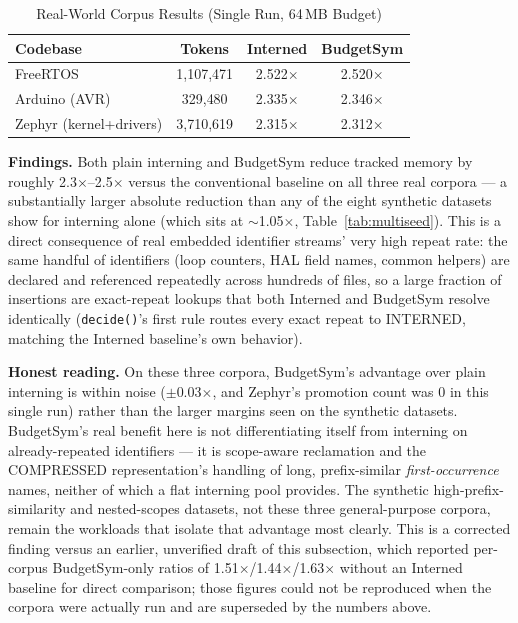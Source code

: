 \documentclass[conference]{IEEEtran}
\begin{document}
\begin{table}[htbp]
\caption{Real-World Corpus Results (Single Run, 64\,MB Budget)}
\label{tab:corpus}
\centering
\small
\begin{tabular}{lccc}
\toprule
Codebase & Tokens & Interned & BudgetSym \\
\midrule
FreeRTOS & 1{,}107{,}471 & 2.522$\times$ & 2.520$\times$ \\
Arduino (AVR) & 329{,}480 & 2.335$\times$ & 2.346$\times$ \\
Zephyr (kernel+drivers) & 3{,}710{,}619 & 2.315$\times$ & 2.312$\times$ \\
\bottomrule
\end{tabular}
\end{table}

\textbf{Findings.} Both plain interning and BudgetSym reduce tracked memory
by roughly 2.3$\times$--2.5$\times$ versus the conventional baseline on all
three real corpora --- a substantially larger absolute reduction than any of
the eight synthetic datasets show for interning alone (which sits at
$\sim$1.05$\times$, Table~\ref{tab:multiseed}). This is a direct consequence
of real embedded identifier streams' very high repeat rate: the same
handful of identifiers (loop counters, HAL field names, common helpers) are
declared and referenced repeatedly across hundreds of files, so a large
fraction of insertions are exact-repeat lookups that both Interned and
BudgetSym resolve identically (\texttt{decide()}'s first rule routes every
exact repeat to INTERNED, matching the Interned baseline's own behavior).

\textbf{Honest reading.} On these three corpora, BudgetSym's advantage over
plain interning is within noise ($\pm$0.03$\times$, and Zephyr's promotion
count was 0 in this single run) rather than the larger margins seen on the
synthetic datasets. BudgetSym's real benefit here is not differentiating
itself from interning on already-repeated identifiers --- it is scope-aware
reclamation and the COMPRESSED representation's handling of long,
prefix-similar \emph{first-occurrence} names, neither of which a flat
interning pool provides. The synthetic high-prefix-similarity and
nested-scopes datasets, not these three general-purpose corpora, remain the
workloads that isolate that advantage most clearly. This is a corrected
finding versus an earlier, unverified draft of this subsection, which
reported per-corpus BudgetSym-only ratios of
1.51$\times$/1.44$\times$/1.63$\times$ without an Interned baseline for
direct comparison; those figures could not be reproduced when the corpora
were actually run and are superseded by the numbers above.
\end{document}
